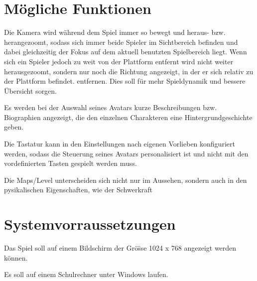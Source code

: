 \documentclass[11pt]{article}
\newcommand{\paragraphspace}{0.3cm}
\begin{document}


    \section{M\"ogliche Funktionen}\label{sec:kann}

    Die Kamera wird w\"ahrend dem Spiel immer so bewegt und heraus- bzw. herangezoomt, sodass sich immer beide
    Spieler im Sichtbereich befinden und dabei gleichzeitig der Fokus auf dem aktuell benutzten Spielbereich liegt. Wenn sich
    ein Spieler jedoch zu weit von der Plattform entfernt wird nicht weiter herausgezoomt, sondern nur noch die Richtung angezeigt,
    in der er sich relativ zu der Plattform befindet. entfernen. Dies soll f\"ur mehr Spieldynamik und bessere \"Ubersicht sorgen.
    \vspace{\paragraphspace}

    \noindent
    Es werden bei der Auswahl seines Avatars kurze Beschreibungen bzw. Biographien angezeigt, die den einzelnen Charakteren
    eine Hintergrundgeschichte geben.
    \vspace{\paragraphspace}

    \noindent
    Die Tastatur kann in den Einstellungen nach eigenen Vorlieben konfiguriert werden, sodass die Steuerung seines Avatars
    personalisiert ist und nicht mit den vordefinierten Tasten gespielt werden muss.
    \vspace{\paragraphspace}

    \noindent
    Die Maps/Level unterscheiden sich nicht nur im Aussehen, sondern auch in den pysikalischen Eigenschaften, wie der
    Schwerkraft

    \section{Systemvorraussetzungen}\label{sec:systemvorraussetungen}

    Das Spiel soll auf einem Bildschirm der Gr\"o\"ss{}e 1024 x 768 angezeigt werden k\"onnen.
    \vspace{\paragraphspace}

    \noindent
    Es soll auf einem Schulrechner unter Windows laufen.
\end{document}
